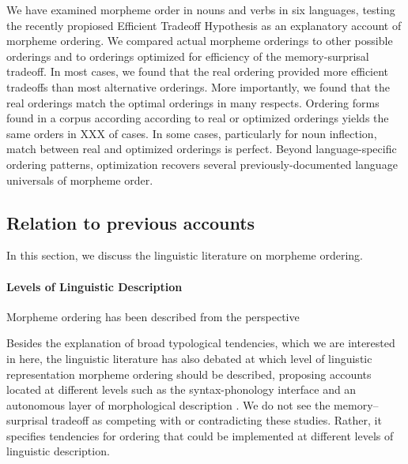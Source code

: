 \documentclass[11pt,letterpaper]{article}
\begin{document}
We have examined morpheme order in nouns and verbs in six languages, testing the recently propiosed Efficient Tradeoff Hypothesis \citep{hahn2020modeling} as an explanatory account of morpheme ordering.
We compared actual morpheme orderings to other possible orderings and to orderings optimized for efficiency of the memory-surprisal tradeoff.
In most cases, we found that the real ordering provided more efficient tradeoffs than most alternative orderings.
More importantly, we found that the real orderings match the optimal orderings in many respects.
Ordering forms found in a corpus according according to real or optimized orderings yields the same orders in XXX of cases.
In some cases, particularly for noun inflection, match between real and optimized orderings is perfect.
Beyond language-specific ordering patterns, optimization recovers several previously-documented language universals of morpheme order.

\subsection{Relation to previous accounts}


In this section, we discuss the linguistic literature on morpheme ordering.

\paragraph{Levels of Linguistic Description}

Morpheme ordering has been described from the perspective 

Besides the explanation of broad typological tendencies, which we are interested in here, the linguistic literature has also debated at which level of linguistic representation morpheme ordering should be described, proposing accounts located at different levels such as the syntax-phonology interface \citep{baker1985the} and an autonomous layer of morphological description \citep{hyman2003suffix}.
We do not see the memory--surprisal tradeoff as competing with or contradicting these studies.
Rather, it specifies tendencies for ordering that could be implemented at different levels of linguistic description.
\end{document}
